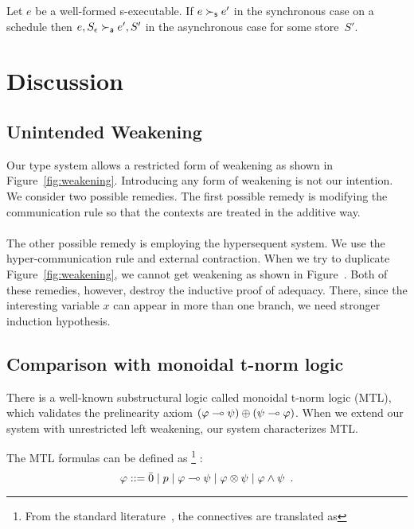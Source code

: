 \begin{proposition}
 Let $e$ be a well-formed s-executable.
 If $e\succ_{\mathsf s} e'$ in the synchronous case on a schedule then $e, S_\epsilon \succ_{\mathsf a} e', S'$
 in the asynchronous case for some store~$S'$.
\end{proposition}

\section{Discussion}

\subsection{Unintended Weakening}

Our type system allows a restricted form of weakening as shown in
Figure~\ref{fig:weakening}.  Introducing any form of weakening is not
our intention.  We consider two possible remedies.  The first possible
remedy is modifying the communication rule so that the contexts are
treated in the additive way.\\
\\
The other possible remedy is employing the hypersequent system.  We use
the hyper-communication rule and external contraction.  When we try to
duplicate Figure~\ref{fig:weakening}, we cannot get weakening as shown
in Figure~.
Both of these remedies, however, destroy the inductive proof of
adequacy.  There, since the
interesting variable $x$ can appear in more than one branch,
we need stronger induction hypothesis.

\subsection{Comparison with monoidal t-norm logic}

There is a well-known substructural logic called monoidal t-norm logic
(MTL), which validates the prelinearity axiom
$(\varphi\multimap\psi)\oplus(\psi\multimap\varphi)$.  When we extend our system with
unrestricted left weakening, our system characterizes MTL.

The MTL formulas can be defined as%
\footnote{From the standard literature~\citep{handbook:fuzzy}, the connectives
are translated as }%
:
\[
 \varphi::= \bar{0}\mid p\mid \varphi\multimap\psi \mid \varphi\otimes \psi \mid \varphi \land \psi\enspace.
\]

